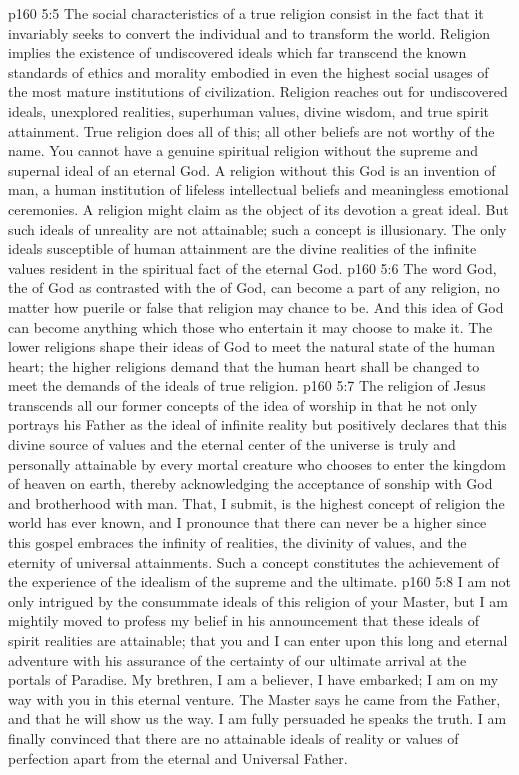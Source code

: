 \vs p160 5:5 The social characteristics of a true religion consist in the fact that it invariably seeks to convert the individual and to transform the world. Religion implies the existence of undiscovered ideals which far transcend the known standards of ethics and morality embodied in even the highest social usages of the most mature institutions of civilization. Religion reaches out for undiscovered ideals, unexplored realities, superhuman values, divine wisdom, and true spirit attainment. True religion does all of this; all other beliefs are not worthy of the name. You cannot have a genuine spiritual religion without the supreme and supernal ideal of an eternal God. A religion without this God is an invention of man, a human institution of lifeless intellectual beliefs and meaningless emotional ceremonies. A religion might claim as the object of its devotion a great ideal. But such ideals of unreality are not attainable; such a concept is illusionary. The only ideals susceptible of human attainment are the divine realities of the infinite values resident in the spiritual fact of the eternal God.
\vs p160 5:6 The word God, the  of God as contrasted with the  of God, can become a part of any religion, no matter how puerile or false that religion may chance to be. And this idea of God can become anything which those who entertain it may choose to make it. The lower religions shape their ideas of God to meet the natural state of the human heart; the higher religions demand that the human heart shall be changed to meet the demands of the ideals of true religion.
\pc \vs p160 5:7 The religion of Jesus transcends all our former concepts of the idea of worship in that he not only portrays his Father as the ideal of infinite reality but positively declares that this divine source of values and the eternal center of the universe is truly and personally attainable by every mortal creature who chooses to enter the kingdom of heaven on earth, thereby acknowledging the acceptance of sonship with God and brotherhood with man. That, I submit, is the highest concept of religion the world has ever known, and I pronounce that there can never be a higher since this gospel embraces the infinity of realities, the divinity of values, and the eternity of universal attainments. Such a concept constitutes the achievement of the experience of the idealism of the supreme and the ultimate.
\vs p160 5:8 I am not only intrigued by the consummate ideals of this religion of your Master, but I am mightily moved to profess my belief in his announcement that these ideals of spirit realities are attainable; that you and I can enter upon this long and eternal adventure with his assurance of the certainty of our ultimate arrival at the portals of Paradise. My brethren, I am a believer, I have embarked; I am on my way with you in this eternal venture. The Master says he came from the Father, and that he will show us the way. I am fully persuaded he speaks the truth. I am finally convinced that there are no attainable ideals of reality or values of perfection apart from the eternal and Universal Father.
